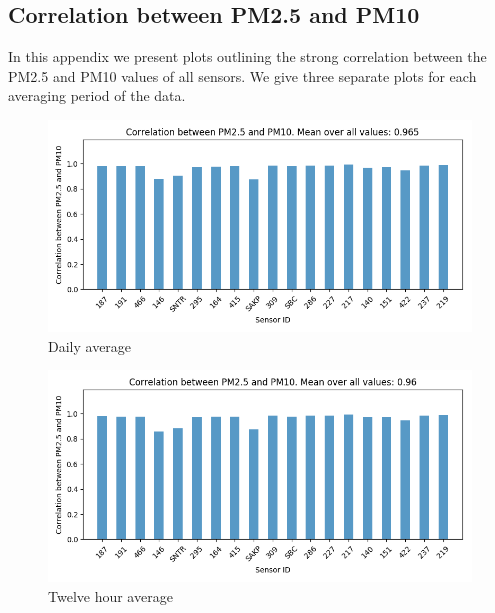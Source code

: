\documentclass[12pt,a4paper,twoside]{scrartcl}
\numberwithin{equation}{section}
\newcounter{mypagecount}%
\newenvironment{interlude}{%
  \clearpage
  \setcounter{mypagecount}{\value{page}}%
  \thispagestyle{empty}%
  \pagestyle{empty}%
}{%
  \clearpage
  \setcounter{page}{\value{mypagecount}}%
}
\let\chapter=\section %
\begin{document}
\begin{interlude}
  
  \begin{appendices}
    \chapter{Correlation between PM2.5 and PM10}\label{app:a}
    In this appendix we present plots outlining the strong correlation between the PM2.5 and PM10 values of all sensors. We give three separate plots for each averaging period of the data.
    \begin{center}

      \begin{figure}[H]
        \centerline{\includegraphics[width=1\textwidth]{figures/data_files_changes/1D_P1_P2_correlation}}
        \caption[PM2.5-PM10 correlation (one day average)]{Daily average}
      \end{figure}

      \begin{figure}[H]
        \centerline{\includegraphics[width=1\textwidth]{figures/data_files_changes/12H_P1_P2_correlation}}
        \caption[PM2.5-PM10 correlation (twelve hour average)]{Twelve hour average}
      \end{figure}


\end{center}
\end{appendices}
\end{interlude}
\end{document}
